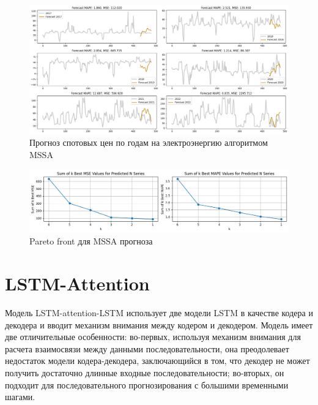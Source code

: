 \documentclass{article}
\begin{document}
\begin{figure}[H]
	\centering
	\includegraphics[width=1\textwidth]{figures/mssa_elspot_6plots.png}
	\caption{Прогноз спотовых цен по годам на электроэнергию алгоритмом MSSA}
	\label{fig:fig3}
\end{figure}

\begin{figure}[H]
	\centering
	\includegraphics[width=1\textwidth]{figures/optimal_front.png}
	\caption{Pareto front для MSSA прогноза}
	\label{fig:fig3}
\end{figure}

\section{LSTM-Attention}

Модель LSTM-attention-LSTM использует две модели LSTM в качестве кодера и декодера и вводит механизм внимания между кодером и декодером. Модель имеет две отличительные особенности: во-первых, используя механизм внимания для расчета взаимосвязи между данными последовательности, она преодолевает недостаток модели кодера-декодера, заключающийся в том, что декодер не может получить достаточно длинные входные последовательности; во-вторых, он подходит для последовательного прогнозирования с большими временными шагами.

\end{document}
